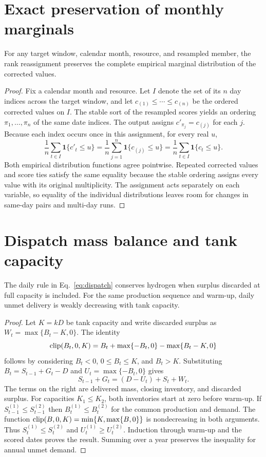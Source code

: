 \section{Exact preservation of monthly marginals}
\label{app:marginals}

\begin{proposition}
For any target window, calendar month, resource, and resampled member, the rank reassignment preserves the complete empirical marginal distribution of the corrected values.
\end{proposition}

\begin{proof}
Fix a calendar month and resource. Let $I$ denote the set of its $n$ day indices across the target window, and let $c_{(1)}\leq\cdots\leq c_{(n)}$ be the ordered corrected values on $I$. The stable sort of the resampled scores yields an ordering $\pi_1,\ldots,\pi_n$ of the same date indices. The output assigns $c'_{\pi_j}=c_{(j)}$ for each $j$. Because each index occurs once in this assignment, for every real $u$,
\[
\frac{1}{n}\sum_{t\in I}\mathbf{1}\{c'_t\leq u\}
=\frac{1}{n}\sum_{j=1}^{n}\mathbf{1}\{c_{(j)}\leq u\}
=\frac{1}{n}\sum_{t\in I}\mathbf{1}\{c_t\leq u\}.
\]
Both empirical distribution functions agree pointwise. Repeated corrected values and score ties satisfy the same equality because the stable ordering assigns every value with its original multiplicity. The assignment acts separately on each variable, so equality of the individual distributions leaves room for changes in same-day pairs and multi-day runs.
\end{proof}

\section{Dispatch mass balance and tank capacity}
\label{app:dispatch}

\begin{proposition}
The daily rule in Eq.~\eqref{eq:dispatch} conserves hydrogen when surplus discarded at full capacity is included. For the same production sequence and warm-up, daily unmet delivery is weakly decreasing with tank capacity.
\end{proposition}

\begin{proof}
Let $K=kD$ be tank capacity and write discarded surplus as $W_t=\max\{B_t-K,0\}$. The identity
\[
\operatorname{clip}(B_t,0,K)=B_t+\max\{-B_t,0\}-\max\{B_t-K,0\}
\]
follows by considering $B_t<0$, $0\leq B_t\leq K$, and $B_t>K$. Substituting $B_t=S_{t-1}+G_t-D$ and $U_t=\max\{-B_t,0\}$ gives
\[
S_{t-1}+G_t=(D-U_t)+S_t+W_t.
\]
The terms on the right are delivered mass, closing inventory, and discarded surplus. For capacities $K_1\leq K_2$, both inventories start at zero before warm-up. If $S_{t-1}^{(1)}\leq S_{t-1}^{(2)}$ then $B_t^{(1)}\leq B_t^{(2)}$ for the common production and demand. The function $\operatorname{clip}(B,0,K)=\min\{K,\max\{B,0\}\}$ is nondecreasing in both arguments. Thus $S_t^{(1)}\leq S_t^{(2)}$ and $U_t^{(1)}\geq U_t^{(2)}$. Induction through warm-up and the scored dates proves the result. Summing over a year preserves the inequality for annual unmet demand.
\end{proof}

